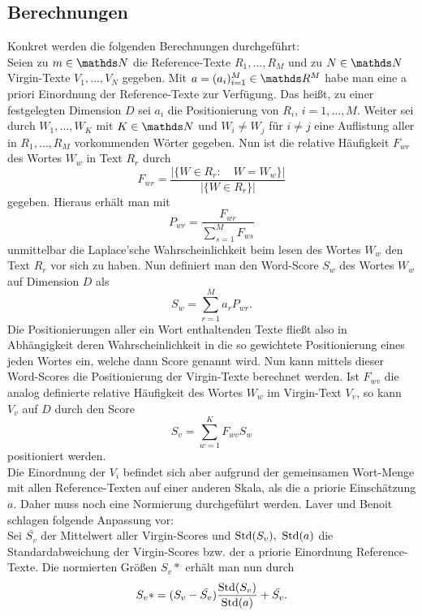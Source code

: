 \subsection{Berechnungen} \label{Berechnungen}

Konkret werden die folgenden Berechnungen durchgeführt: \\
Seien zu $m\in\N$ die Reference-Texte  $R_1,\ldots,R_M$ und zu $N\in\N$ Virgin-Texte $V_1,\ldots,V_N$ gegeben. 
Mit $a=(a_i)_{i=1}^M\in\R^M$ habe man eine a priori Einordnung der Reference-Texte zur Verfügung.
Das heißt, zu einer festgelegten Dimension $D$ sei $a_i$ die Positionierung von $R_i$, $i=1,\ldots,M$. 
Weiter sei durch $W_1,\ldots,W_K$ mit $K\in\N$ und $W_i\neq W_j$ für $i\neq j$ 
eine Auflistung aller in $R_1,\ldots,R_M$ vorkommenden Wörter gegeben. 
Nun ist die relative Häufigkeit $F_{wr}$ des Wortes $W_w$ in Text $R_r$ durch
\begin{displaymath}
F_{wr} = \frac{|\{W\in R_r:\quad W=W_w  \}|}{|\{W\in R_r\}|}
\end{displaymath}
gegeben. Hieraus erhält man mit
\begin{displaymath}
P_{wr} = \frac{F_{wr}}{\sum_{s=1}^M F_{ws}}
\end{displaymath}
unmittelbar die Laplace'sche Wahrscheinlichkeit beim lesen des Wortes $W_w$ den Text $R_r$ vor sich zu haben. Nun definiert man den Word-Score $S_{w}$ des Wortes $W_w$ auf Dimension $D$ als
\begin{displaymath}
S_w = \sum_{r=1}^M a_r P_{wr}.
\end{displaymath}
Die Positionierungen aller ein Wort enthaltenden Texte fließt also in Abhängigkeit deren Wahrscheinlichkeit in die so gewichtete Positionierung eines jeden Wortes ein, welche dann Score genannt wird. Nun kann mittels dieser Word-Scores die Positionierung der Virgin-Texte berechnet werden. Ist $F_{wv}$ die analog definierte relative Häufigkeit des Wortes $W_w$ im Virgin-Text $V_v$, so kann $V_v$ auf $D$ durch den Score
\begin{displaymath}
S_v = \sum_{w=1}^K F_{wv} S_w
\end{displaymath}
positioniert werden. \\
Die Einordnung der $V_i$ befindet sich aber aufgrund der gemeinsamen Wort-Menge mit allen Reference-Texten auf einer anderen Skala, als die a priorie Einschätzung $a$. 
Daher muss noch eine Normierung durchgeführt werden. Laver und Benoit schlagen folgende Anpassung vor: \\
Sei $\bar{S_v}$ der Mittelwert aller Virgin-Scores und $\operatorname{Std}(S_v),~\operatorname{Std}(a)$ die Standardabweichung der Virgin-Scores bzw. der a priorie Einordnung Reference-Texte. Die normierten Größen $S_v*$ erhält man nun durch
\begin{displaymath}
S_v* = (S_v - \bar{S_v}) \frac{\operatorname{Std}(S_v)}{\operatorname{Std}(a)} +\bar{S_v}. 
\end{displaymath}   
  
